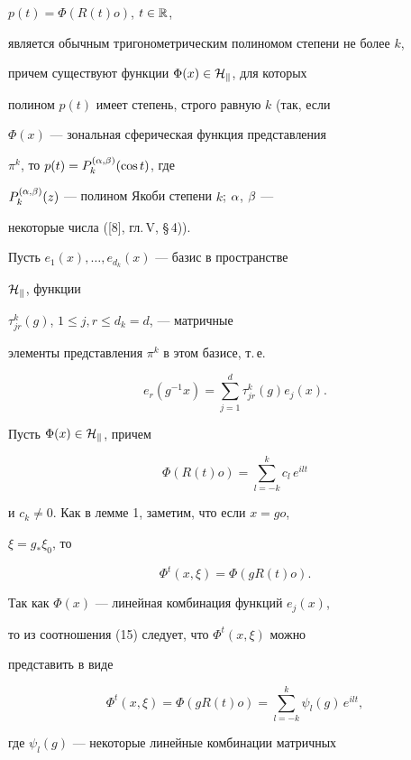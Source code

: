 \begin{pf}
$p(t)=\Phi(R(t)o)$, $t\in\Bbb R$,


является обычным тригонометрическим полиномом степени не более $k$,


причем существуют функции $\Phi(x)\in\cal H_k$, для которых


полином $p(t)$ имеет степень, строго равную $k$ (так, если


$\Phi(x)$ --- зональная сферическая функция представления


$\pi^k$, то $p(t)=P_k^{(\alpha,\beta)}(\cos t)$, где


$P_k^{(\alpha,\beta)}(z)$ --- полином Якоби степени $k$; $\alpha$, $\beta$ ---


некоторые числа ([8], гл.\,V, \S\,4)).





Пусть $e_1(x),\dotsc, e_{d_k}(x)$ --- базис в пространстве


$\cal H_k$, функции


$\tau_{jr}^k(g)$, $1\le j,r\le d_k=d$, --- матричные


элементы представления $\pi^k$ в этом базисе, т.\,е.


\begin{equation}


e_r(g^{-1}x)=\sum_{j=1}^d \tau^k_{jr}(g)e_j(x).


\end{equation}


Пусть $\Phi(x)\in\cal H_k$, причем


$$


\Phi(R(t)o)=\sum_{l=-k}^k c_l\, e^{ilt}


$$


и $c_k\ne 0$. Как в лемме 1, заметим, что если $x=go$,


$\xi=g_*\xi_0$, то


$$


\Phi^t(x,\xi)=\Phi(gR(t)o).


$$


Так как $\Phi(x)$ --- линейная комбинация функций $e_j(x)$,


то из соотношения (15) следует, что $\Phi^t(x,\xi)$ можно


представить в виде


$$


\Phi^t(x,\xi)=\Phi(gR(t)o)=\sum_{l=-k}^k \psi_l(g)\,


e^{ilt},


$$


где $\psi_l(g)$ --- некоторые линейные комбинации матричных



\end{pf}
